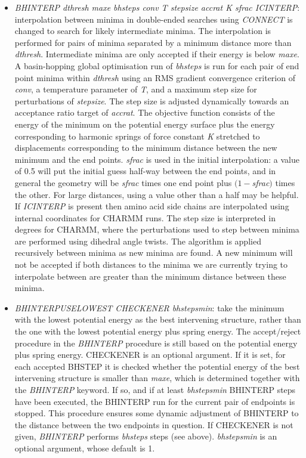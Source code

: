 \documentclass[12pt,a4paper,dvips]{article}
\begin{document}
\begin{itemize}
\item {\it BHINTERP\/ dthresh maxe bhsteps conv T stepsize accrat K sfrac ICINTERP}: interpolation
between minima in double-ended searches using {\it CONNECT\/} is changed to search
for likely intermediate minima. The interpolation is performed for pairs of minima
separated by a minimum distance more than {\it dthresh\/}. 
Intermediate minima are only accepted if their energy is below {\it maxe}.
A basin-hopping global optimisation run of {\it bhsteps} is run for each pair of
end point minima within {\it dthresh\/} using an RMS gradient convergence criterion
of {\it conv\/}, a temperature parameter of {\it T\/}, and a maximum step size for
perturbations of {\it stepsize\/}. The step size is adjusted dynamically towards an
acceptance ratio target of {\it accrat\/}. 
The objective function consists of the energy of the minimum on the potential energy surface
plus the energy corresponding to harmonic springs of force constant {\it K\/}
stretched to displacements corresponding to the minimum distance between the new minimum
and the end points.
{\it sfrac\/} is used in the initial interpolation: a value of 0.5 will put the initial
guess half-way between the end points, and in general the geometry will be {\it sfrac\/} times one 
end point plus $(1-${\it sfrac\/}$)$ times the other. 
For large distances, using a value other than a half may be helpful.
If {\it ICINTERP\/} is present then amino acid side chains are interpolated using
internal coordinates for CHARMM runs.
The step size is interpreted in degrees for CHARMM, where the perturbations used 
to step between minima are performed using dihedral angle twists.
The algorithm is applied recursively between minima as new minima are found.
A new minimum will not be accepted if both distances to the minima we are
currently trying to interpolate between are greater than the minimum distance
between these minima.

\item {\it BHINTERPUSELOWEST\/ CHECKENER bhstepsmin}: take the minimum with the lowest potential energy
as the best intervening structure, rather than the one with the lowest potential energy
plus spring energy. The accept/reject procedure in the {\it BHINTERP\/} procedure
is still based on the potential energy plus spring energy.
CHECKENER is an optional argument. If it is set, for each accepted BHSTEP it is checked whether
the potential energy of the best intervening structure is smaller than {\it maxe}, which
is determined together with the {\it BHINTERP} keyword.  
If so, and if at least {\it bhstepsmin} BHINTERP steps have been executed,
the BHINTERP run for the current pair of endpoints is stopped.
This procedure ensures some dynamic adjustment of BHINTERP to the distance between the 
two endpoints in question. If CHECKENER is not given, {\it BHINTERP} performs
{\it bhsteps} steps (see above). {\it bhstepsmin} is an optional argument, whose default is 1. 


\end{itemize}
\end{document}
